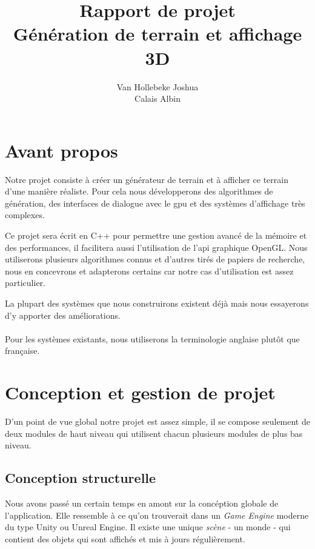 \documentclass[11pt]{article} %
\title{Rapport de projet\\Génération de terrain et affichage 3D}
\author{Van Hollebeke Joshua\\Calais Albin}
\begin{document}
\maketitle

\section{Avant propos}


Notre projet consiste à créer un générateur de terrain et à afficher ce terrain d'une manière réaliste. Pour cela nous développerons des algorithmes de génération, des interfaces de dialogue avec le gpu et des systèmes d'affichage très complexes.

Ce projet sera écrit en C++ pour permettre une gestion avancé de la mémoire et des performances, il facilitera aussi l'utilisation de l'api graphique OpenGL.
Nous utiliserons plusieurs algorithmes connus et d'autres tirés de papiers de recherche, nous en concevrons et adapterons certains car notre cas d'utilisation est assez particulier.

La plupart des systèmes que nous construirons existent déjà mais nous essayerons d'y apporter des améliorations.

\paragraph{}
Pour les systèmes existants, nous utiliserons la terminologie anglaise plutôt que française.

\section{Conception et gestion de projet}

D'un point de vue global notre projet est assez simple, il se compose seulement de deux modules de haut niveau qui utilisent chacun plusieurs modules de plus bas niveau.


\subsection{Conception structurelle}

Nous avons passé un certain temps en amont sur la concéption globale de l'application. Elle ressemble à ce qu'on trouverait dans un \textit{Game Engine} moderne du type Unity ou Unreal Engine. Il existe une unique \textit{scène} - un monde - qui contient des objets qui sont affichés et mis à jours régulièrement.
\end{document}
